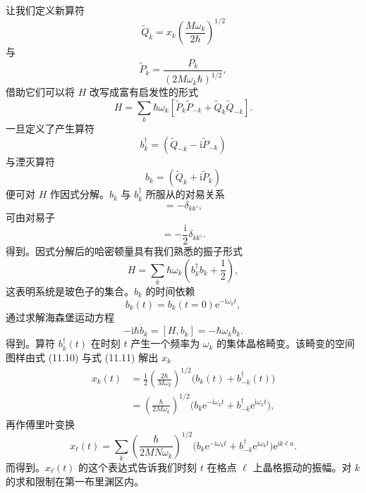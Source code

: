 让我们定义新算符
\begin{equation*}
\tilde{Q}_k=x_k\left(\frac{M\omega_k}{2\hbar}\right)^{1/2}\tag{11.7}
\end{equation*}
与
\begin{equation*}
\tilde{P}_k=\frac{P_k}{(2M\omega_k\hbar)^{1/2}},\tag{11.8}
\end{equation*}
借助它们可以将 $H$ 改写成富有启发性的形式
\begin{equation*}
H=\sum_k\hbar\omega_k[\tilde{P}_k\tilde{P}_{-k}+\tilde{Q}_k\tilde{Q}_{-k}].\tag{11.9}
\end{equation*}
一旦定义了产生算符
\begin{equation*}
b_k^{\dagger}=(\tilde{Q}_{-k}-\mathrm{i}\tilde{P}_{-k})\tag{11.10}
\end{equation*}
与湮灭算符
\begin{equation*}
b_k=(\tilde{Q}_k+\mathrm{i}\tilde{P}_k)\tag{11.11}
\end{equation*}
便可对 $H$ 作因式分解。$b_k$ 与 $b_k^{\dagger}$ 所服从的对易关系
\begin{equation*}
[b_k^{\dagger},b_{k'}]=-\delta_{kk'},\tag{11.12}
\end{equation*}
可由对易子
\begin{equation*}
[\tilde{P}_k,\tilde{Q}_{-k'}]=-\frac{\mathrm{i}}{2}\delta_{kk'}.\tag{11.13}
\end{equation*}
得到。因式分解后的哈密顿量具有我们熟悉的振子形式
\begin{equation*}
H=\sum_k\hbar\omega_k\left(b_k^{\dagger}b_k+\frac{1}{2}\right),\tag{11.14}
\end{equation*}
这表明系统是玻色子的集合。$b_k$ 的时间依赖
\begin{equation*}
b_k(t)=b_k(t=0)\mathrm{e}^{-\mathrm{i}\omega_k t},\tag{11.15}
\end{equation*}
通过求解海森堡运动方程
\begin{equation*}
-\mathrm{i}\hbar\dot{b}_k=[H,b_k]=-\hbar\omega_k b_k.\tag{11.16}
\end{equation*}
得到。算符 $b_k^{\dagger}(t)$ 在时刻 $t$ 产生一个频率为 $\omega_k$ 的集体晶格畸变。该畸变的空间图样由式 (11.10) 与式 (11.11) 解出 $x_k$
\begin{align*}
x_k(t)&=\frac{1}{2}\left(\frac{2\hbar}{M\omega_k}\right)^{1/2}\bigl(b_k(t)+b_{-k}^{\dagger}(t)\bigr)\\
&=\left(\frac{\hbar}{2M\omega_k}\right)^{1/2}\bigl(b_k\mathrm{e}^{-\mathrm{i}\omega_k t}+b_{-k}^{\dagger}\mathrm{e}^{\mathrm{i}\omega_k t}\bigr),\tag{11.17}
\end{align*}
再作傅里叶变换
\begin{equation*}
x_{\ell}(t)=\sum_k\left(\frac{\hbar}{2MN\omega_k}\right)^{1/2}\bigl(b_k\mathrm{e}^{-\mathrm{i}\omega_k t}+b_{-k}^{\dagger}\mathrm{e}^{\mathrm{i}\omega_k t}\bigr)\mathrm{e}^{\mathrm{i}k\ell a}.\tag{11.18}
\end{equation*}
而得到。$x_{\ell}(t)$ 的这个表达式告诉我们时刻 $t$ 在格点 $\ell$ 上晶格振动的振幅。对 $k$ 的求和限制在第一布里渊区内。


